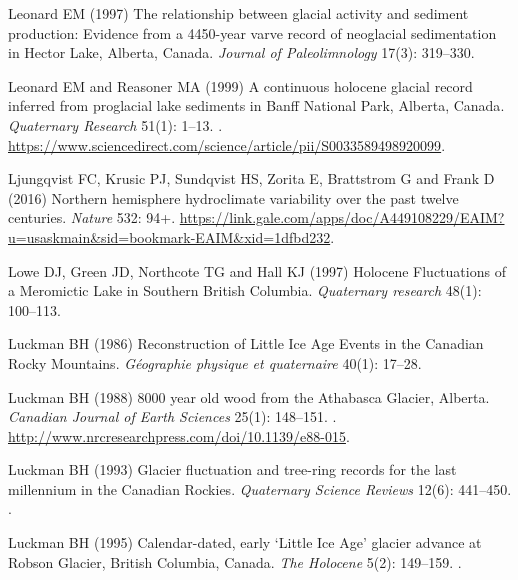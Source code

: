 \documentclass[Royal,times,doublespace,sageh]{sagej}
\begin{document}
\begin{thebibliography}{69}
Leonard EM (1997) {The relationship between glacial activity and sediment
  production: Evidence from a 4450-year varve record of neoglacial
  sedimentation in Hector Lake, Alberta, Canada}.
\newblock \emph{Journal of Paleolimnology} 17(3): 319--330.

Leonard EM and Reasoner MA (1999) {A continuous holocene glacial record
  inferred from proglacial lake sediments in Banff National Park, Alberta,
  Canada}.
\newblock \emph{Quaternary Research} 51(1): 1--13.
\newblock {}.
\newblock
  \urlprefix\url{https://www.sciencedirect.com/science/article/pii/S0033589498920099}.

Ljungqvist FC, Krusic PJ, Sundqvist HS, Zorita E, Brattstrom G and Frank D
  (2016) {Northern hemisphere hydroclimate variability over the past twelve
  centuries}.
\newblock \emph{Nature} 532: 94+.
\newblock
  \urlprefix\url{https://link.gale.com/apps/doc/A449108229/EAIM?u=usaskmain&sid=bookmark-EAIM&xid=1dfbd232}.

Lowe DJ, Green JD, Northcote TG and Hall KJ (1997) {Holocene Fluctuations of a
  Meromictic Lake in Southern British Columbia}.
\newblock \emph{Quaternary research} 48(1): 100--113.

Luckman BH (1986) {Reconstruction of Little Ice Age Events in the Canadian
  Rocky Mountains}.
\newblock \emph{G{\'{e}}ographie physique et quaternaire} 40(1): 17--28.

Luckman BH (1988) {8000 year old wood from the Athabasca Glacier, Alberta}.
\newblock \emph{Canadian Journal of Earth Sciences} 25(1): 148--151.
\newblock {}.
\newblock \urlprefix\url{http://www.nrcresearchpress.com/doi/10.1139/e88-015}.

Luckman BH (1993) {Glacier fluctuation and tree-ring records for the last
  millennium in the Canadian Rockies}.
\newblock \emph{Quaternary Science Reviews} 12(6): 441--450.
\newblock {}.

Luckman BH (1995) {Calendar-dated, early ‘Little Ice Age' glacier advance at
  Robson Glacier, British Columbia, Canada}.
\newblock \emph{The Holocene} 5(2): 149--159.
\newblock {}.


\end{thebibliography}
\end{document}
